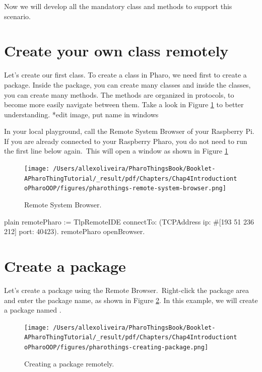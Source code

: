 \documentclass[10pt,twoside,english]{_support/latex/sbabook/sbabook}
\begin{document}
Now we will develop all the mandatory class and methods to support this scenario.
\section{Create your own class remotely}
Let's create our first class. To create a class in Pharo, we need first to create a package. Inside the package, you can create many classes and inside the classes, you can create many methods. The methods are organized in protocols, to become more easily navigate between them. Take a look in Figure \ref{RemoteBrowser} to better understanding. *edit image, put name in windows

In your local playground, call the Remote System Browser of your Raspberry Pi. If you are already connected to your Raspberry Pharo, you do not need to run the first line below again. This will open a window as shown in Figure \ref{RemoteBrowser} 


\begin{figure}

\begin{center}
\texttt{[image: /Users/allexoliveira/PharoThingsBook/Booklet-APharoThingTutorial/\_result/pdf/Chapters/Chap4IntroductiontoPharoOOP/figures/pharothings-remote-system-browser.png]}\caption{Remote System Browser.\label{RemoteBrowser}}\end{center}
\end{figure}


\begin{displaycode}{plain}
remotePharo := TlpRemoteIDE connectTo: (TCPAddress ip: #[193 51 236 212] port: 40423).
remotePharo openBrowser.
\end{displaycode}
\section{Create a package}
Let's create a package using the Remote Browser. Right-click the package area and enter the package name, as shown in Figure \ref{CreatingPackage}. In this example, we will create a package named .


\begin{figure}

\begin{center}
\texttt{[image: /Users/allexoliveira/PharoThingsBook/Booklet-APharoThingTutorial/\_result/pdf/Chapters/Chap4IntroductiontoPharoOOP/figures/pharothings-creating-package.png]}\caption{Creating a package remotely.\label{CreatingPackage}}\end{center}
\end{figure}
\end{document}
